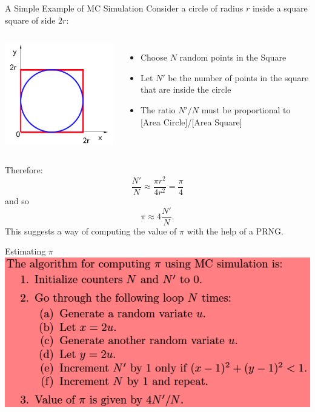 \documentclass[xcolor=x11names,compress]{beamer}
\renewcommand{\(}{\begin{columns}}
\renewcommand{\)}{\end{columns}}
\newcommand{\<}[1]{\begin{column}{#1}}
\renewcommand{\>}{\end{column}}
\begin{document}
\begin{frame}{A Simple Example of MC Simulation}
Consider a circle of radius $r$ inside a square square of side $2r$:
\begin{columns}
	\includegraphics[scale=0.4]{rng4}
	\begin{itemize}
	\item Choose $N$ random points in the Square
	\item Let $N'$ be the number of points in the square that are inside the circle
	\item The ratio $N'/N$ must be proportional to [Area Circle]/[Area Square] 
	\end{itemize}
	\end{columns}
	
Therefore:
\[
\frac{N'}{N}\approx\frac{\pi r^2}{4r^2}=\frac{\pi}{4}
\]
and so
\[
\pi \approx 4\frac{N'}{N}.
\]
This suggests a way of computing the value of $\pi$ with the help of a PRNG. 
\end{frame}
\begin{frame}{Estimating $\pi$}
\includegraphics[scale=0.5]{rng5}
\end{frame}
\end{document}
